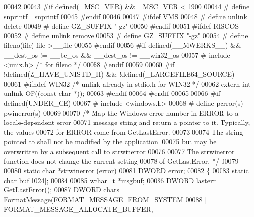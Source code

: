 \begin{DoxyCode}
00042 
00043 \textcolor{preprocessor}{#if defined(\_MSC\_VER) && \_MSC\_VER < 1900}
00044 \textcolor{preprocessor}{#  define snprintf \_snprintf}
00045 \textcolor{preprocessor}{#endif}
00046 
00047 \textcolor{preprocessor}{#ifdef VMS}
00048 \textcolor{preprocessor}{#  define unlink delete}
00049 \textcolor{preprocessor}{#  define GZ\_SUFFIX "-gz"}
00050 \textcolor{preprocessor}{#endif}
00051 \textcolor{preprocessor}{#ifdef RISCOS}
00052 \textcolor{preprocessor}{#  define unlink remove}
00053 \textcolor{preprocessor}{#  define GZ\_SUFFIX "-gz"}
00054 \textcolor{preprocessor}{#  define fileno(file) file->\_\_file}
00055 \textcolor{preprocessor}{#endif}
00056 \textcolor{preprocessor}{#if defined(\_\_MWERKS\_\_) && \_\_dest\_os != \_\_be\_os && \_\_dest\_os != \_\_win32\_os}
00057 \textcolor{preprocessor}{#  include <unix.h>} \textcolor{comment}{/* for fileno */}
00058 \textcolor{preprocessor}{#endif}
00059 
00060 \textcolor{preprocessor}{#if !defined(Z\_HAVE\_UNISTD\_H) && !defined(\_LARGEFILE64\_SOURCE)}
00061 \textcolor{preprocessor}{#ifndef WIN32 }\textcolor{comment}{/* unlink already in stdio.h for WIN32 */}\textcolor{preprocessor}{}
00062   \textcolor{keyword}{extern} \textcolor{keywordtype}{int} unlink OF((\textcolor{keyword}{const} \textcolor{keywordtype}{char} *));
00063 \textcolor{preprocessor}{#endif}
00064 \textcolor{preprocessor}{#endif}
00065 
00066 \textcolor{preprocessor}{#if defined(UNDER\_CE)}
00067 \textcolor{preprocessor}{#  include <windows.h>}
00068 \textcolor{preprocessor}{#  define perror(s) pwinerror(s)}
00069 
00070 \textcolor{comment}{/* Map the Windows error number in ERROR to a locale-dependent error}
00071 \textcolor{comment}{   message string and return a pointer to it.  Typically, the values}
00072 \textcolor{comment}{   for ERROR come from GetLastError.}
00073 \textcolor{comment}{}
00074 \textcolor{comment}{   The string pointed to shall not be modified by the application,}
00075 \textcolor{comment}{   but may be overwritten by a subsequent call to strwinerror}
00076 \textcolor{comment}{}
00077 \textcolor{comment}{   The strwinerror function does not change the current setting}
00078 \textcolor{comment}{   of GetLastError.  */}
00079 
00080 \textcolor{keyword}{static} \textcolor{keywordtype}{char} *strwinerror (error)
00081      DWORD error;
00082 \{
00083     \textcolor{keyword}{static} \textcolor{keywordtype}{char} buf[1024];
00084 
00085     \textcolor{keywordtype}{wchar\_t} *msgbuf;
00086     DWORD lasterr = GetLastError();
00087     DWORD chars = FormatMessage(FORMAT\_MESSAGE\_FROM\_SYSTEM
00088         | FORMAT\_MESSAGE\_ALLOCATE\_BUFFER,

\end{DoxyCode}
